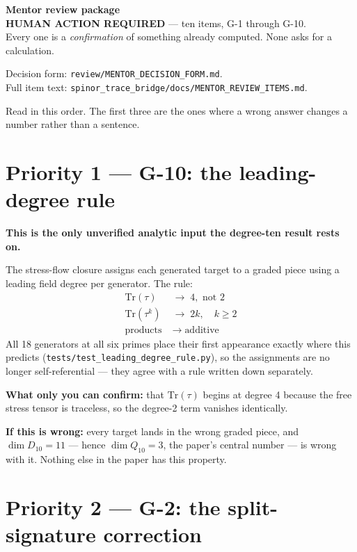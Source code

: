 \documentclass[11pt,a4paper]{article}
\begin{document}
\begin{center}
{\Large\textbf{Mentor review package}}\\[0.4em]
\textbf{HUMAN ACTION REQUIRED} --- ten items, G-1 through G-10.\\
Every one is a \emph{confirmation} of something already computed. None asks for a calculation.
\end{center}

Decision form: \texttt{review/MENTOR\_DECISION\_FORM.md}.\\
Full item text: \texttt{spinor\_trace\_bridge/docs/MENTOR\_REVIEW\_ITEMS.md}.

Read in this order. The first three are the ones where a wrong answer changes a
number rather than a sentence.

\hrulefill

\section*{Priority 1 --- G-10: the leading-degree rule}

\textbf{This is the only unverified analytic input the degree-ten result rests on.}

The stress-flow closure assigns each generated target to a graded piece using a
leading field degree per generator. The rule:
\begin{align*}
\mathrm{Tr}(\tau)   &\;\longrightarrow\; 4, \text{ not } 2\\
\mathrm{Tr}(\tau^k) &\;\longrightarrow\; 2k, \quad k \ge 2\\
\text{products}     &\;\longrightarrow\; \text{additive}
\end{align*}
All 18 generators at all six primes place their first appearance exactly where
this predicts (\texttt{tests/test\_leading\_degree\_rule.py}), so the assignments
are no longer self-referential --- they agree with a rule written down separately.

\textbf{What only you can confirm:} that $\mathrm{Tr}(\tau)$ begins at degree 4
because the free stress tensor is traceless, so the degree-2 term vanishes
identically.

\textbf{If this is wrong:} every target lands in the wrong graded piece, and
$\dim D_{10} = 11$ --- hence $\dim Q_{10} = 3$, the paper's central number --- is
wrong with it. Nothing else in the paper has this property.

\section*{Priority 2 --- G-2: the split-signature correction}
\end{document}
